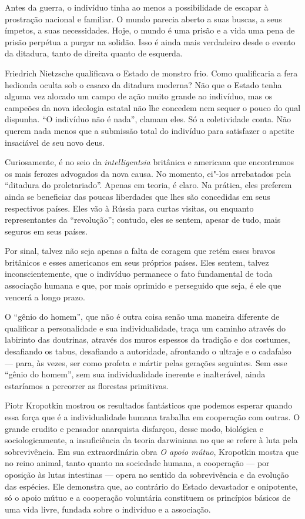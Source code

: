 Antes da guerra, o indivíduo tinha ao menos a possibilidade de escapar à
prostração nacional e familiar. O mundo parecia aberto a suas buscas,
a seus ímpetos, a suas necessidades. Hoje, o mundo é uma prisão e a
vida uma pena de prisão perpétua a purgar na solidão. Isso é ainda mais
verdadeiro desde o evento da ditadura, tanto de direita quanto de
esquerda.

Friedrich Nietzsche qualificava o Estado de monstro frio. Como
qualificaria a fera hedionda oculta sob o casaco da ditadura moderna?
Não que o Estado tenha alguma vez alocado um campo de ação muito grande 
ao indivíduo, mas os campeões da nova ideologia estatal não lhe
concedem nem sequer o pouco do qual dispunha. “O indivíduo não é nada”,
clamam eles. Só a coletividade conta. Não querem nada menos que a
submissão total do indivíduo para satisfazer o apetite insaciável de
seu novo deus.

Curiosamente, é no seio da \textit{intelligentsia} britânica e americana que
encontramos os mais ferozes advogados da nova causa. No momento,
ei"-los arrebatados pela “ditadura do proletariado”. Apenas em teoria,
é claro. Na prática, eles preferem ainda se beneficiar das poucas
liberdades que lhes são concedidas em seus respectivos países. Eles vão
à Rússia para curtas visitas, ou enquanto representantes da
“revolução”; contudo, eles se sentem, apesar de tudo, mais seguros em
seus países.

Por sinal, talvez não seja apenas a falta de coragem que retém esses
bravos britânicos e esses americanos em seus próprios países. Eles
sentem, talvez inconscientemente, que o indivíduo permanece o fato
fundamental de toda associação humana e que, por mais oprimido e
perseguido que seja, é ele que vencerá a longo prazo.

O “gênio do homem”, que não é outra coisa senão uma maneira diferente de
qualificar a personalidade e sua individualidade, traça um caminho
através do labirinto das doutrinas, através dos muros espessos da
tradição e dos costumes, desafiando os tabus, desafiando a autoridade,
afrontando o ultraje e o cadafalso --- para, às vezes, ser como profeta e
mártir pelas gerações seguintes. Sem esse “gênio do homem”, sem sua
individualidade inerente e inalterável, ainda estaríamos a percorrer as
florestas primitivas.

Piotr Kropotkin mostrou os resultados fantásticos que podemos esperar
quando essa força que é a individualidade humana trabalha em cooperação
com outras. O grande erudito e pensador anarquista disfarçou, desse
modo, biológica e sociologicamente, a insuficiência da teoria
darwiniana no que se refere à luta pela sobrevivência. Em sua
extraordinária obra \textit{O apoio mútuo}, Kropotkin mostra que no reino
animal, tanto quanto na sociedade humana, a cooperação --- por oposição
às lutas intestinas --- opera no sentido da sobrevivência e da evolução
das espécies. Ele demonstra que, ao contrário do Estado devastador e
onipotente, só o apoio mútuo e a cooperação voluntária constituem os
princípios básicos de uma vida livre, fundada sobre o indivíduo e a
associação.

